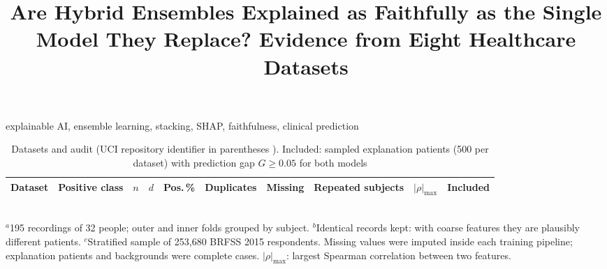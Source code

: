 \documentclass[conference]{IEEEtran}
\begin{document}
\title{Are Hybrid Ensembles Explained as Faithfully as the Single Model They Replace? Evidence from Eight Healthcare Datasets}

\author{
\and
{}
\and
{}
}

\maketitle



\begin{IEEEkeywords}
explainable AI, ensemble learning, stacking, SHAP, faithfulness, clinical prediction
\end{IEEEkeywords}




\begin{table}[t]
\caption{Datasets and audit (UCI repository identifier in parentheses \cite{uci_repo}). Included: sampled explanation patients (500 per dataset) with prediction gap $G\ge0.05$ for both models}
\label{tab:data}
\centering\footnotesize
\setlength{\tabcolsep}{3.2pt}
\begin{tabular}{@{}llrrrlllrr@{}}
\toprule
Dataset & Positive class & $n$ & $d$ & Pos.\,\% & Duplicates & Missing & Repeated subjects & $|\rho|_{\max}$ & Included \\
\midrule

\bottomrule
\end{tabular}\\[2pt]
{\scriptsize $^a$195 recordings of 32 people; outer and inner folds grouped by subject. $^b$Identical records kept: with coarse features they are plausibly different patients. $^c$Stratified sample of 253{,}680 BRFSS 2015 respondents. Missing values were imputed inside each training pipeline; explanation patients and backgrounds were complete cases. $|\rho|_{\max}$: largest Spearman correlation between two features.}
\end{table}





\begin{thebibliography}{99}

\end{thebibliography}
\end{document}
